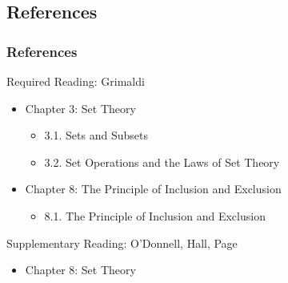 \documentclass[dvipsnames]{beamer}
\begin{document}
\subsection*{References}

\begin{frame}
  \frametitle{References}

  \begin{block}{Required Reading: Grimaldi}
    \begin{itemize}
      \item Chapter 3: Set Theory
      \begin{itemize}
        \item 3.1. \alert{Sets and Subsets}
        \item 3.2. \alert{Set Operations and the Laws of Set Theory}
      \end{itemize}

      \item Chapter 8: The Principle of Inclusion and Exclusion
      \begin{itemize}
        \item 8.1. \alert{The Principle of Inclusion and Exclusion}
      \end{itemize}
    \end{itemize}
  \end{block}

  \begin{block}{Supplementary Reading: O'Donnell, Hall, Page}
    \begin{itemize}
      \item Chapter 8: Set Theory
    \end{itemize}
  \end{block}
\end{frame}
\end{document}
